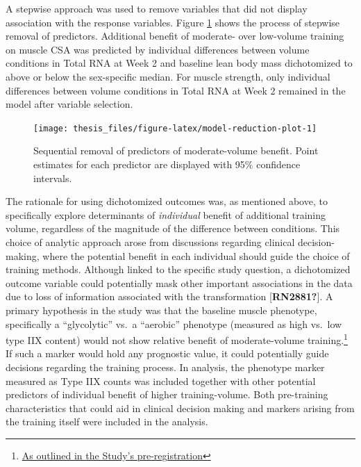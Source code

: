 \documentclass[twoside,10pt]{gihclass} %
\begin{document}
A stepwise approach was used to remove variables that did not display association with the response variables. Figure \ref{fig:model-reduction-plot} shows the process of stepwise removal of predictors.
Additional benefit of moderate- over low-volume training on muscle CSA was predicted by individual differences between volume conditions in Total RNA at Week 2 and baseline lean body mass dichotomized to above or below the sex-specific median.
For muscle strength, only individual differences between volume conditions in Total RNA at Week 2 remained in the model after variable selection.
\begin{figure}

{\centering \texttt{[image: thesis\_files/figure-latex/model-reduction-plot-1]} 

}

\caption[Step-wise variable selection of determinants of moderate- over low-volume training benefit.]{Sequential removal of predictors of moderate-volume benefit. Point estimates for each predictor are displayed with 95\% confidence intervals.}\label{fig:model-reduction-plot}
\end{figure}
The rationale for using dichotomized outcomes was, as mentioned above, to specifically explore determinants of \emph{individual} benefit of additional training volume, regardless of the magnitude of the difference between conditions.
This choice of analytic approach arose from discussions regarding clinical decision-making, where the potential benefit in each individual should guide the choice of training methods.
Although linked to the specific study question, a dichotomized outcome variable could potentially mask other important associations in the data due to loss of information associated with the transformation
{[}\textbf{RN2881?}{]}.
A primary hypothesis in the study was that the baseline muscle phenotype, specifically a ``glycolytic'' vs.~a ``aerobic'' phenotype (measured as high vs.~low type IIX content) would not show relative benefit of moderate-volume training.\footnote{\href{https://clinicaltrials.gov/ct2/show/NCT02179307?term=lillehammer\&draw=2\&rank=9}{As outlined in the Study's pre-registration}}
If such a marker would hold any prognostic value, it could potentially guide decisions regarding the training process.
In analysis, the phenotype marker measured as Type IIX counts was included together with other potential predictors of individual benefit of higher training-volume.
Both pre-training characteristics that could aid in clinical decision making and markers arising from the training itself were included in the analysis.
\end{document}
